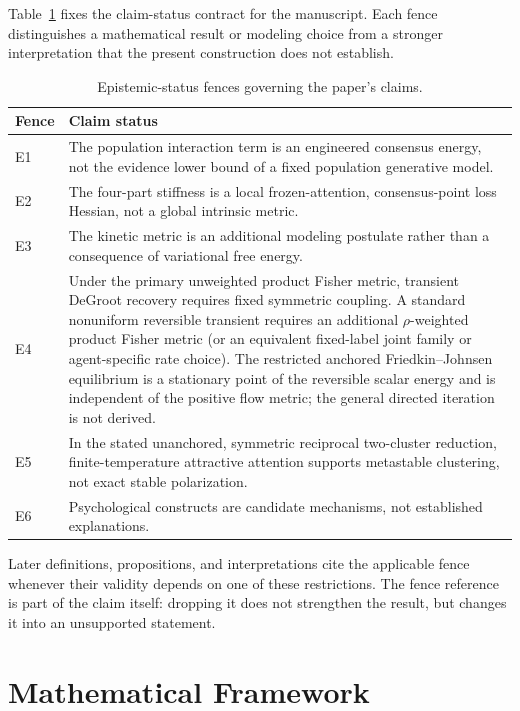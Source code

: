 \documentclass[12pt]{article}
\begin{document}
Table~\ref{tab:epistemic-status} fixes the claim-status contract for the manuscript. Each fence distinguishes a mathematical result or modeling choice from a stronger interpretation that the present construction does not establish.

\begin{table}[H]
\centering
\small
\caption{Epistemic-status fences governing the paper's claims.}
\label{tab:epistemic-status}
\begin{tabular}{@{}>{\raggedright\arraybackslash}p{}>{\raggedright\arraybackslash}p{}@{}}
\toprule
Fence & Claim status \\
\midrule
E1 & The population interaction term is an engineered consensus energy, not the evidence lower bound of a fixed population generative model. \\
E2 & The four-part stiffness is a local frozen-attention, consensus-point loss Hessian, not a global intrinsic metric. \\
E3 & The kinetic metric is an additional modeling postulate rather than a consequence of variational free energy. \\
E4 & Under the primary unweighted product Fisher metric, transient DeGroot recovery requires fixed symmetric coupling. A standard nonuniform reversible transient requires an additional $\rho$-weighted product Fisher metric (or an equivalent fixed-label joint family or agent-specific rate choice). The restricted anchored Friedkin--Johnsen equilibrium is a stationary point of the reversible scalar energy and is independent of the positive flow metric; the general directed iteration is not derived. \\
E5 & In the stated unanchored, symmetric reciprocal two-cluster reduction, finite-temperature attractive attention supports metastable clustering, not exact stable polarization. \\
E6 & Psychological constructs are candidate mechanisms, not established explanations. \\
\bottomrule
\end{tabular}
\end{table}

Later definitions, propositions, and interpretations cite the applicable fence whenever their validity depends on one of these restrictions. The fence reference is part of the claim itself: dropping it does not strengthen the result, but changes it into an unsupported statement.

\section{Mathematical Framework}
\end{document}
